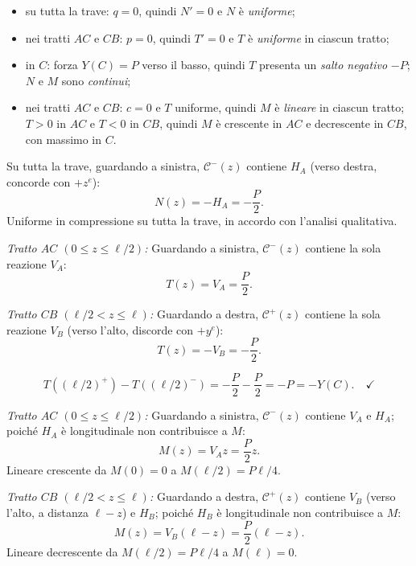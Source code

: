 \begin{esempio}
\begin{svolgimento}
		\begin{itemize}[nosep]
			\item su tutta la trave: $q = 0$, quindi
			$N' = 0$ e $N$ è \emph{uniforme};
			\item nei tratti $AC$ e $CB$: $p = 0$,
			quindi $T' = 0$ e $T$ è
			\emph{uniforme} in ciascun tratto;
			\item in $C$: forza $Y(C) = P$ verso il
			basso, quindi $T$ presenta un
			\emph{salto negativo} $-P$; $N$ e
			$M$ sono \emph{continui};
			\item nei tratti $AC$ e $CB$: $c = 0$ e
			$T$ uniforme, quindi $M$ è
			\emph{lineare} in ciascun tratto;
			$T > 0$ in $AC$ e $T < 0$ in $CB$,
			quindi $M$ è crescente in $AC$ e
			decrescente in $CB$, con massimo
			in $C$.
		\end{itemize}
		
		
		Su tutta la trave, guardando a sinistra,
		$\mathcal{C}^-(z)$ contiene $H_A$ (verso
		destra, concorde con $+z^e$):
		\[
		N(z) = -H_A = -\frac{P}{2}.
		\]
		Uniforme in compressione su tutta la trave,
		in accordo con l'analisi qualitativa.
		
		
		\textit{Tratto $AC$ $(0 \leq z \leq \ell/2)$:}
		Guardando a sinistra, $\mathcal{C}^-(z)$
		contiene la sola reazione $V_A$:
		\[
		T(z) = V_A = \frac{P}{2}.
		\]
		
		\textit{Tratto $CB$ $(\ell/2 < z \leq \ell)$:}
		Guardando a destra, $\mathcal{C}^+(z)$
		contiene la sola reazione $V_B$ (verso l'alto,
		discorde con $+y^e$):
		\[
		T(z) = -V_B = -\frac{P}{2}.
		\]
		
		\[
		T((\ell/2)^+) - T((\ell/2)^-)
		= -\frac{P}{2} - \frac{P}{2}
		= -P = -Y(C). \quad\checkmark
		\]
		
		
		\textit{Tratto $AC$ $(0 \leq z \leq \ell/2)$:}
		Guardando a sinistra, $\mathcal{C}^-(z)$
		contiene $V_A$ e $H_A$; poiché $H_A$ è
		longitudinale non contribuisce a $M$:
		\[
		M(z) = V_A z = \frac{P}{2}z.
		\]
		Lineare crescente da $M(0) = 0$ a
		$M(\ell/2) = P\ell/4$.
		
		\textit{Tratto $CB$ $(\ell/2 < z \leq \ell)$:}
		Guardando a destra, $\mathcal{C}^+(z)$
		contiene $V_B$ (verso l'alto, a distanza
		$\ell - z$) e $H_B$; poiché $H_B$ è
		longitudinale non contribuisce a $M$:
		\[
		M(z) = V_B(\ell - z) = \frac{P}{2}(\ell - z).
		\]
		Lineare decrescente da $M(\ell/2) = P\ell/4$
		a $M(\ell) = 0$.
		

\end{svolgimento}
\end{esempio}
